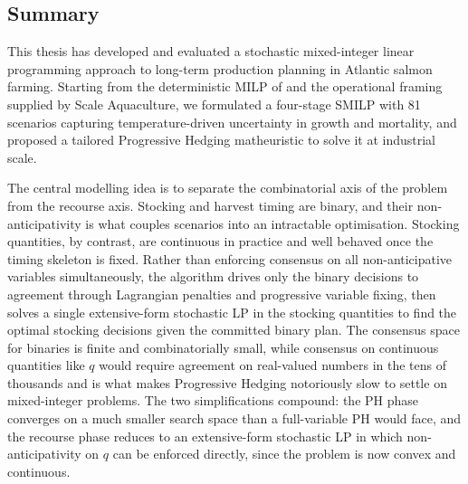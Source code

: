 \documentclass[12pt,a4paper]{article}
\begin{document}


\subsection{Summary}
\label{sec:conclusion}

This thesis has developed and evaluated a stochastic mixed-integer linear programming approach to long-term production planning in Atlantic salmon farming. Starting from the deterministic MILP of \citet{ErikstadHaugland2025} and the operational framing supplied by Scale Aquaculture, we formulated a four-stage SMILP with 81 scenarios capturing temperature-driven uncertainty in growth and mortality, and proposed a tailored Progressive Hedging matheuristic to solve it at industrial scale.

The central modelling idea is to separate the combinatorial axis of the problem from the recourse axis. Stocking and harvest timing are binary, and their non-anticipativity is what couples scenarios into an intractable optimisation. Stocking quantities, by contrast, are continuous in practice and well behaved once the timing skeleton is fixed. Rather than enforcing consensus on all non-anticipative variables simultaneously, the algorithm drives only the binary decisions to agreement through Lagrangian penalties and progressive variable fixing, then solves a single extensive-form stochastic LP in the stocking quantities to find the optimal stocking decisions given the committed binary plan. 
The consensus space for binaries is finite and combinatorially small, while consensus on continuous quantities like $q$ would require agreement on real-valued numbers in the tens of thousands and is what makes Progressive Hedging notoriously slow to settle on mixed-integer problems. The two simplifications compound: the PH phase converges on a much smaller search space than a full-variable PH would face, and the recourse phase reduces to an extensive-form stochastic LP in which non-anticipativity on $q$ can be enforced directly, since the problem is now convex and continuous.
\end{document}
